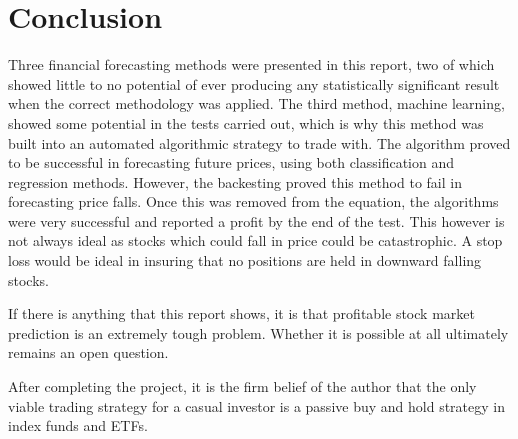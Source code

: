 \chapter{Conclusion}

Three financial forecasting methods were presented in this report, two of which showed little to no potential of ever producing any statistically significant result when the correct methodology was applied. The third method, machine learning, showed some potential in the tests carried out, which is why this method was built into an automated algorithmic strategy to trade with. The algorithm proved to be successful in forecasting future prices, using both classification and regression methods. However, the backesting proved this method to fail in forecasting price falls. Once this was removed from the equation, the algorithms were very successful and reported a profit by the end of the test. This however is not always ideal as stocks which could fall in price could be catastrophic. A stop loss would be ideal in insuring that no positions are held in downward falling stocks.

If there is anything that this report shows, it is that profitable stock market prediction is an extremely tough problem. Whether it is possible at all ultimately remains an open question.

After completing the project, it is the firm belief of the author that the only viable trading strategy for a casual investor is a passive buy and hold strategy in index funds and ETFs.